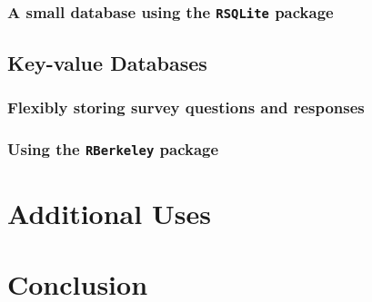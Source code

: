 \documentclass[]{article}
\begin{document}
\subsubsection{A small database using the \texttt{RSQLite} package}

\subsection{Key-value Databases}

\subsubsection{Flexibly storing survey questions and responses}

\subsubsection{Using the \texttt{RBerkeley} package}

\section{Additional Uses}
\label{sec:additionaluses}


\section{Conclusion}



\end{document}
